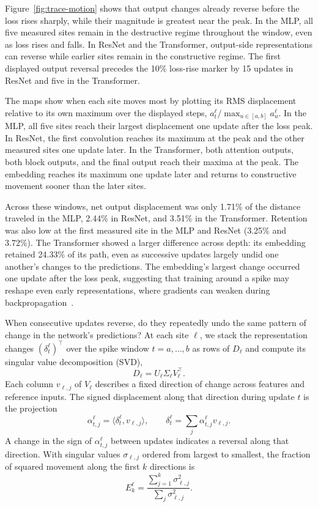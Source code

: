 Figure~\ref{fig:trace-motion} shows that output changes already reverse before the loss rises sharply, while their magnitude is greatest near the peak. In the MLP, all five measured sites remain in the destructive regime throughout the window, even as loss rises and falls. In ResNet and the Transformer, output-side representations can reverse while earlier sites remain in the constructive regime. The first displayed output reversal precedes the 10\% loss-rise marker by 15 updates in ResNet and five in the Transformer.

The maps show when each site moves most by plotting its RMS displacement relative to its own maximum over the displayed steps, $a_t^\ell/\max_{u\in[a,b]}a_u^\ell$. In the MLP, all five sites reach their largest displacement one update after the loss peak. In ResNet, the first convolution reaches its maximum at the peak and the other measured sites one update later. In the Transformer, both attention outputs, both block outputs, and the final output reach their maxima at the peak. The embedding reaches its maximum one update later and returns to constructive movement sooner than the later sites.

Across these windows, net output displacement was only 1.71\% of the distance traveled in the MLP, 2.44\% in ResNet, and 3.51\% in the Transformer. Retention was also low at the first measured site in the MLP and ResNet (3.25\% and 3.72\%). The Transformer showed a larger difference across depth: its embedding retained 24.33\% of its path, even as successive updates largely undid one another's changes to the predictions. The embedding's largest change occurred one update after the loss peak, suggesting that training around a spike may reshape even early representations, where gradients can weaken during backpropagation~\cite{glorot2010difficulty}.

When consecutive updates reverse, do they repeatedly undo the same pattern of change in the network's predictions? At each site $\ell$, we stack the representation changes $(\delta_t^\ell)^\top$ over the spike window $t=a,\ldots,b$ as rows of $D_\ell$ and compute its singular value decomposition (SVD),
\begin{equation}
 D_\ell=U_\ell\Sigma_\ell V_\ell^\top.
 \label{eq:temporal-svd}
\end{equation}
Each column $v_{\ell,j}$ of $V_\ell$ describes a fixed direction of change across features and reference inputs. The signed displacement along that direction during update $t$ is the projection
\begin{equation}
 \alpha_{t,j}^\ell=\langle\delta_t^\ell,v_{\ell,j}\rangle,\qquad
 \delta_t^\ell=\sum_j\alpha_{t,j}^\ell v_{\ell,j}.
 \label{eq:pattern-reconstruction}
\end{equation}
A change in the sign of $\alpha_{t,j}^\ell$ between updates indicates a reversal along that direction. With singular values $\sigma_{\ell,j}$ ordered from largest to smallest, the fraction of squared movement along the first $k$ directions is
\begin{equation}
 E_k^\ell=\frac{\sum_{j=1}^k\sigma_{\ell,j}^2}
 {\sum_j\sigma_{\ell,j}^2}.
 \label{eq:energy}
\end{equation}

